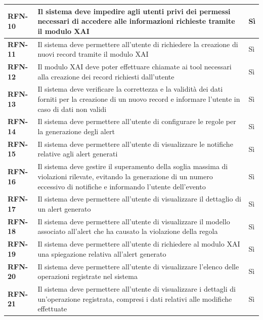 \begin{longtable}{|l|p{}|l|}
        \hline
        \textbf{RFN-10} & Il sistema deve impedire agli utenti privi dei permessi necessari di accedere alle informazioni richieste tramite il modulo XAI & Sì  \\
        \hline
        \textbf{RFN-11} & Il sistema deve permettere all'utente di richiedere la creazione di nuovi record tramite il modulo XAI & Sì  \\
        \hline
        \textbf{RFN-12} & Il modulo XAI deve poter effettuare chiamate ai tool necessari alla creazione dei record richiesti dall'utente & Sì  \\
        \hline
        \textbf{RFN-13} & Il sistema deve verificare la correttezza e la validità dei dati forniti per la creazione di un nuovo record e informare l'utente in caso di dati non validi & Sì \\
        \hline
        \textbf{RFN-14} & Il sistema deve permettere all'utente di configurare le regole per la generazione degli alert & Sì  \\
        \hline
        \textbf{RFN-15} & Il sistema deve permettere all'utente di visualizzare le notifiche relative agli alert generati & Sì  \\
        \hline
        \textbf{RFN-16} & Il sistema deve gestire il superamento della soglia massima di violazioni rilevate, evitando la generazione di un numero eccessivo di notifiche e informando l'utente dell'evento & Sì  \\
        \hline
        \textbf{RFN-17} & Il sistema deve permettere all'utente di visualizzare il dettaglio di un alert generato & Sì  \\
        \hline
        \textbf{RFN-18} & Il sistema deve permettere all'utente di visualizzare il modello associato all'alert che ha causato la violazione della regola & Sì  \\
        \hline
        \textbf{RFN-19} & Il sistema deve permettere all'utente di richiedere al modulo XAI una spiegazione relativa all'alert generato & Sì \\
        \hline
        \textbf{RFN-20} & Il sistema deve permettere all'utente di visualizzare l'elenco delle operazioni registrate nel sistema & Sì \\
        \hline
        \textbf{RFN-21} & Il sistema deve permettere all'utente di visualizzare i dettagli di un'operazione registrata, compresi i dati relativi alle modifiche effettuate & Sì\\
        \hline
    \end{longtable}

